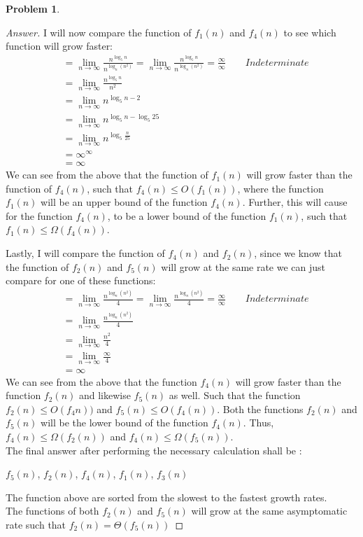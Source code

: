 \documentclass[11pt]{article}
\theoremstyle{definition}
\theoremstyle{definition}
\newtheorem{required}{Problem}
\theoremstyle{definition}
\begin{document}
\begin{required}
\begin{enumerate}[label=(\alph*)]
\begin{proof}[Answer]
I will now compare the function of $f_1(n)$ and  $f_4(n)$ to see which function will grow faster: \\
\begin{align*}
&= \lim_{n \to \infty} \frac{n^{\log_5 n}}{n^{\log_n(n^2)}} = \lim_{n \to \infty} \frac{n^{\log_5 n}}{n^{\log_n(n^2)}}  = \frac{\infty}{\infty} \qquad Indeterminate  \\
&= \lim_{n \to \infty} \frac{n^{\log_5 n}}{n^2} \\
&= \lim_{n \to \infty} n^{{\log_5 n}-{2}} \\
&= \lim_{n \to \infty} n^{{\log_5 n}-{\log_5 25}} \\
&= \lim_{n \to \infty} n^{\log_5 \frac{n}{25}}\\
&= \infty^{\infty}\\
&= \infty
\end{align*} 
We can see from the above that the function of $f_1(n)$ will grow faster than the function of $f_4(n)$, such that $f_4(n) \leq O(f_1(n))$, where the function $f_1(n)$ will be an upper bound of the function $f_4(n)$. Further, this will cause for the function $f_4(n)$, to be a lower bound of the function $f_1(n)$, such that $f_1(n) \leq \Omega(f_4(n))$.

Lastly, I will compare the function of $f_4(n)$ and $f_2(n)$, since we know that the function of $f_2(n)$ and $f_5(n)$ will grow at the same rate we can just compare for one of these functions:\\
\begin{align*}
&= \lim_{n \to \infty} \frac{n^{\log_n(n^2)}}{4} = \lim_{n \to \infty} \frac{n^{\log_n(n^2)}}{4} = \frac{\infty}{\infty} \qquad Indeterminate  \\
&= \lim_{n \to \infty} \frac{n^{\log_n(n^2)}}{4}  \\
&= \lim_{n \to \infty} \frac{n^{2}}{4}\\
&= \lim_{n \to \infty} \frac{\infty}{4} \\
&= \infty
\end{align*} 
We can see from the above that the function $f_4(n)$ will grow faster than the function $f_2(n)$ and likewise $f_5(n)$ as well. Such that the function $f_2(n) \leq O(f_4n))$ and $f_5(n) \leq O(f_4(n))$. Both the functions $f_2(n)$ and $f_5(n)$ will be the lower bound of the function $f_4(n)$. Thus, $f_4(n) \leq \Omega(f_2(n))$ and $f_4(n) \leq \Omega(f_5(n))$. \\

The final answer after performing the necessary calculation shall be : \\
\begin{center}
$f_5(n)$, $f_2(n)$, $f_4(n)$, $f_1(n)$, $f_3(n)$
\end{center}
The function above are sorted from the slowest to the fastest growth rates. \\
The functions of both $f_2(n)$ and $f_5(n)$ will grow at the same asymptomatic rate such that $f_2(n) = \Theta(f_5(n))$
        \end{proof}
        \newpage


\end{enumerate}
\end{required}
\end{document}
